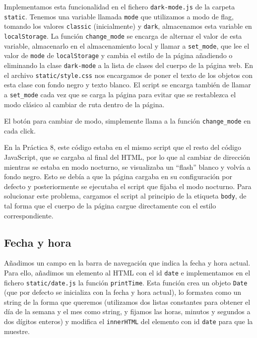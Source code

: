 \documentclass{article}
\begin{document}
Implementamos esta funcionalidad en el fichero \texttt{dark-mode.js}
de la carpeta \texttt{static}. Tenemos una variable llamada
\texttt{mode} que utilizamos a modo de flag, tomando los valores
\texttt{classic} (inicialmente) y \texttt{dark}, almacenamos esta
variable en \texttt{localStorage}. La función \texttt{change\_mode} se
encarga de alternar el valor de esta variable, almacenarlo en el
almacenamiento local y llamar a \texttt{set\_mode}, que lee el valor
de \texttt{mode} de \texttt{localStorage} y cambia el estilo de la
página añadiendo o eliminando la clase \texttt{dark-mode} a la lista
de clases del cuerpo de la página web. En el archivo
\texttt{static/style.css} nos encargamos de poner el texto de los
objetos con esta clase con fondo negro y texto blanco.  El script se
encarga también de llamar a \texttt{set\_mode} cada vez que se carga
la página para evitar que se restablezca el modo clásico al cambiar de
ruta dentro de la página.

El botón para cambiar de modo, simplemente llama a la función
\texttt{change\_mode} en cada click.

En la Práctica 8, este código estaba en el mismo script que el resto
del código JavaScript, que se cargaba al final del HTML, por lo que al
cambiar de dirección mientras se estaba en modo nocturno, se
visualizaba un ``flash'' blanco y volvía a fondo negro. Esto se debía
a que la página cargaba en su configuración por defecto y
posteriormente se ejecutaba el script que fijaba el modo
nocturno. Para solucionar este problema, cargamos el script al
principio de la etiqueta \texttt{body}, de tal forma que el cuerpo de
la página cargue directamente con el estilo correspondiente.

\subsection{Fecha y hora}

Añadimos un campo en la barra de navegación que indica la fecha y hora
actual. Para ello, añadimos un elemento al HTML con el id
\texttt{date} e implementamos en el fichero \texttt{static/date.js} la
función \texttt{printTime}. Esta función crea un objeto \texttt{Date}
(que por defecto se inicializa con la fecha y hora actual), lo
formatea como un string de la forma que queremos (utilizamos dos
listas constantes para obtener el día de la semana y el mes como
string, y fijamos las horas, minutos y segundos a dos dígitos enteros)
y modifica el \texttt{innerHTML} del elemento con id \texttt{date}
para que la muestre.
\end{document}
